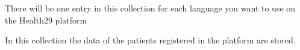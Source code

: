 \documentclass[letterpaper,10pt,english]{sphinxmanual}
\begin{document}
There will be one entry in this collection for each language you want to use on the Health29 platform

\begin{sphinxVerbatim}[commandchars=\\\{\}]
   
           
       	      
               
\end{sphinxVerbatim}

In this collection the data of the patients registered in the platform are stored.
\end{document}
